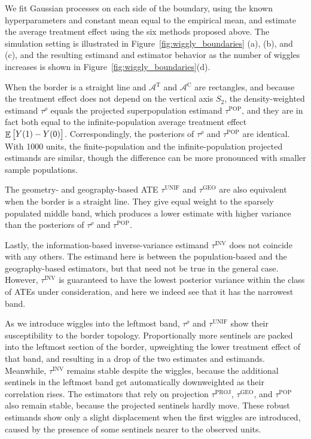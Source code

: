\documentclass[letter]{article}
\DeclareMathOperator{\E}{\mathbb{E}}
\newcommand{\area}{\mathcal{A}}
\newcommand{\treat}{\mathrm{T}}
\newcommand{\ctrol}{\mathrm{C}}
\newcommand{\treatarea}{\area{}^{\treat}}
\newcommand{\ctrolarea}{\area{}^{\ctrol}}
\newcommand{\unifavg}{\tau^{\mathrm{UNIF}}}
\newcommand{\invvar}{\tau^{\mathrm{INV}}}
\newcommand{\taurho}{\tau^{\rho}}
\newcommand{\tauproj}{\tau^{\mathrm{PROJ}}}
\newcommand{\taugeo}{\tau^{\mathrm{GEO}}}
\newcommand{\taupop}{\tau^{\mathrm{POP}}}
\begin{document}
    	We fit Gaussian processes on each side of the boundary,
using the known hyperparameters and constant mean equal to the empirical mean,
and estimate the average treatment effect using the six methods proposed above.
The simulation setting is illustrated in Figure~\ref{fig:wiggly_boundaries} (a), (b), and (c),
and the resulting estimand and estimator behavior as the number of wiggles increases is shown in Figure~\ref{fig:wiggly_boundaries}(d).

When the border is a straight line and \(\treatarea\) and \(\ctrolarea\) are rectangles,
and because the treatment effect does not depend on the vertical axis \(S_2\),
the density-weighted estimand \(\taurho\) equals the projected superpopulation estimand \(\taupop\),
and they are in fact both equal to the infinite-population average treatment effect \(\E\sbr{Y(1)-Y(0)}\).
Correspondingly, the posteriors of \(\taurho\) and \(\taupop\) are identical.
With 1000 units, the finite-population and the infinite-population projected estimands are similar, though the difference can be more pronounced with smaller sample populations.

The geometry- and geography-based ATE \(\unifavg\) and \(\taugeo\) are also equivalent when the border is a straight line.
They give equal weight to the sparsely populated middle band, which produces a lower estimate with higher variance than the posteriors of \(\taurho\) and \(\taupop\).

Lastly, the information-based inverse-variance estimand \(\invvar\) does not coincide with any others.
The estimand here is between the population-based and the geography-based estimators, but that need not be true in the general case.
However, \(\invvar\) is guaranteed to have the lowest posterior variance within the class of ATEs under consideration, and here we indeed see that it has the narrowest band.

As we introduce wiggles into the leftmost band,
\(\taurho\) and \(\unifavg\) show their susceptibility to the border topology.
Proportionally more sentinels are packed into the leftmost section of the border,
upweighting the lower treatment effect of that band,
and resulting in a drop of the two estimates and estimands.
Meanwhile, \(\invvar\) remains stable despite the wiggles,
because the additional sentinels in the leftmost
band get automatically downweighted as their correlation rises.
The estimators that rely on projection
\(\tauproj\), \(\taugeo\), and \(\taupop\) also remain stable,
because the projected sentinels hardly move.
These robust estimands show only a slight displacement when the first wiggles are introduced,
caused by the presence of some sentinels nearer to the observed units.
\end{document}
